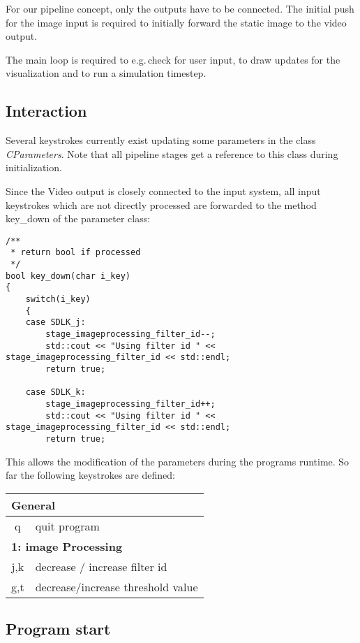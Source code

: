 \noindent
For our pipeline concept, only the outputs have to be connected.
The initial push for the image input is required to initially forward the static
image to the video output.

The main loop is required to e.g.\,check for user input, to draw updates for the
visualization and to run a simulation timestep.


\subsection{Interaction}
Several keystrokes currently exist updating some parameters in the class
\textit{CParameters}.
Note that all pipeline stages get a reference to this class during
initialization.

Since the Video output is closely connected to the input system, all
input keystrokes which are not directly processed are forwarded to the method
key\_down of the parameter class:

\begin{lstlisting}
/**
 * return bool if processed
 */
bool key_down(char i_key)
{
	switch(i_key)
	{
	case SDLK_j:
		stage_imageprocessing_filter_id--;
		std::cout << "Using filter id " << stage_imageprocessing_filter_id << std::endl;
		return true;

	case SDLK_k:
		stage_imageprocessing_filter_id++;
		std::cout << "Using filter id " << stage_imageprocessing_filter_id << std::endl;
		return true;
\end{lstlisting}

\noindent
This allows the modification of the parameters during the programs runtime.
So far the following keystrokes are defined:

\noindent
\begin{tabular}{|c|l|}
	\hline
	\multicolumn{2}{|l|}{\textbf{General}}	\\
	\hline
	q & quit program	\\
	\hline
	\hline

	\multicolumn{2}{|l|}{\textbf{1: image Processing}}	\\
	\hline
	j,k & decrease / increase filter id\\
	\hline
	g,t & decrease/increase threshold value\\
	\hline
\end{tabular}


\subsection{Program start}

